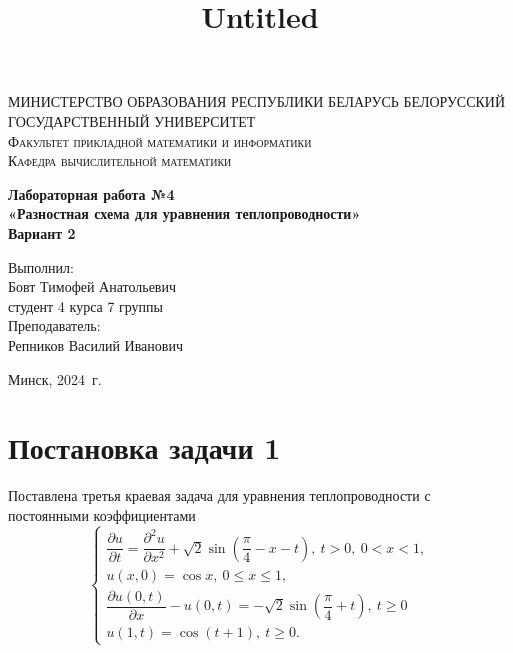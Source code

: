 \documentclass[a4paper, 12pt]{article}
\title{Untitled}
\renewcommand{\d}{\partial}
\begin{document}
    
    \begin{titlepage}
    	\begin{center}
    		\textsc{МИНИСТЕРСТВО ОБРАЗОВАНИЯ РЕСПУБЛИКИ БЕЛАРУСЬ БЕЛОРУССКИЙ ГОСУДАРСТВЕННЫЙ УНИВЕРСИТЕТ
    			\\[5mm]
    			Факультет прикладной математики и информатики\\[2mm]
    			Кафедра вычислительной математики
    		}
    		
    		\vfill
    		
    		\textbf{Лабораторная работа №4
    			\\[3mm]
    			«Разностная схема для уравнения теплопроводности»\\[6mm]
    			Вариант 2
    			\\[20mm]
    		}
    	\end{center}
    	
    	\hfill
    	\begin{minipage}{.4\textwidth}
    		Выполнил:\\[2mm] 
    		Бовт Тимофей Анатольевич\\
    		студент 4 курса 7 группы\\[5mm]
    		
    		Преподаватель:\\[2mm] 
    		Репников Василий Иванович
    	\end{minipage}%
    	\vfill
    	\begin{center}
    		Минск, 2024\ г.
    	\end{center}
    \end{titlepage}
    
    \newpage
    \section*{Постановка задачи 1}
    Поставлена третья краевая задача для уравнения теплопроводности с постоянными коэффициентами
    \begin{equation}
    	\begin{cases}
    		\dfrac{\d u}{\d t} = \dfrac{\d ^2 u}{\d x^2} + \sqrt 2\sin \left(\dfrac \pi 4  - x - t\right),\ t>0,\ 0 < x < 1,\\
    		u(x,0) = \cos x,\ 0 \leq x \leq 1,\\
    		\dfrac{\d u(0,t)}{\d x} - u(0, t) = -\sqrt2 \sin\left(\dfrac \pi 4 + t\right),\ t\geq 0\\ 
    		u(1,t) = \cos(t+1),\ t\geq 0.
    	\end{cases}
    \end{equation}
\end{document}
